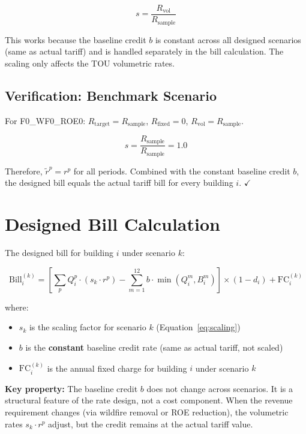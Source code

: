 \documentclass[11pt]{article}
\newcommand{\Rsample}{R_{\text{sample}}}
\newcommand{\Rtarget}{R_{\text{target}}}
\newcommand{\Rvol}{R_{\text{vol}}}
\newcommand{\Rfixed}{R_{\text{fixed}}}
\begin{document}
\begin{equation}
\boxed{s = \frac{\Rvol}{\Rsample}}
\label{eq:scaling}
\end{equation}

This works because the baseline credit $b$ is constant across all designed scenarios (same as actual tariff) and is handled separately in the bill calculation. The scaling only affects the TOU volumetric rates.

\subsection{Verification: Benchmark Scenario}

For F0\_WF0\_ROE0: $\Rtarget = \Rsample$, $\Rfixed = 0$, $\Rvol = \Rsample$.

\[
s = \frac{\Rsample}{\Rsample} = 1.0
\]

Therefore, $\tilde{r}^p = r^p$ for all periods. Combined with the constant baseline credit $b$, the designed bill equals the actual tariff bill for every building $i$. $\checkmark$

\section{Designed Bill Calculation}

The designed bill for building $i$ under scenario $k$:

\begin{equation}
\boxed{\text{Bill}_i^{(k)} = \left[ \sum_p Q_i^p \cdot (s_k \cdot r^p) - \sum_{m=1}^{12} b \cdot \min(Q_i^m, B_i^m) \right] \times (1 - d_i) + \text{FC}_i^{(k)}}
\label{eq:designed_bill}
\end{equation}

where:
\begin{itemize}
    \item $s_k$ is the scaling factor for scenario $k$ (Equation~\ref{eq:scaling})
    \item $b$ is the \textbf{constant} baseline credit rate (same as actual tariff, not scaled)
    \item $\text{FC}_i^{(k)}$ is the annual fixed charge for building $i$ under scenario $k$
\end{itemize}

\textbf{Key property:} The baseline credit $b$ does not change across scenarios. It is a structural feature of the rate design, not a cost component. When the revenue requirement changes (via wildfire removal or ROE reduction), the volumetric rates $s_k \cdot r^p$ adjust, but the credit remains at the actual tariff value.
\end{document}
